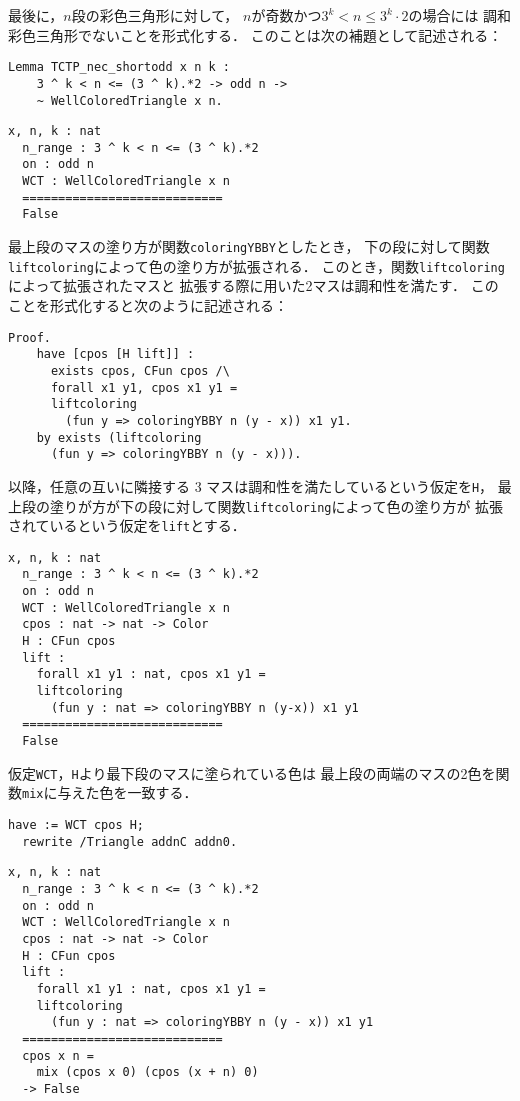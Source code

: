 最後に，$n$段の彩色三角形に対して，
$n$が奇数かつ$3^{k} < n \leq 3^{k} \cdot 2$の場合には
調和彩色三角形でないことを形式化する．
このことは次の補題として記述される：
\begin{lstlisting}[language=Coq]
  Lemma TCTP_nec_shortodd x n k :
    3 ^ k < n <= (3 ^ k).*2 -> odd n ->
    ~ WellColoredTriangle x n.
\end{lstlisting}
\begin{lstlisting}[language=Coq]
  x, n, k : nat
  n_range : 3 ^ k < n <= (3 ^ k).*2
  on : odd n
  WCT : WellColoredTriangle x n
  ============================
  False
\end{lstlisting}
最上段のマスの塗り方が関数{\tt{coloringYBBY}}としたとき，
下の段に対して関数{\tt{liftcoloring}}によって色の塗り方が拡張される．
このとき，関数{\tt{liftcoloring}}によって拡張されたマスと
拡張する際に用いた2マスは調和性を満たす．
このことを形式化すると次のように記述される：
\begin{lstlisting}[language=Coq]
  Proof.
    have [cpos [H lift]] :
      exists cpos, CFun cpos /\
      forall x1 y1, cpos x1 y1 =
      liftcoloring
        (fun y => coloringYBBY n (y - x)) x1 y1.
    by exists (liftcoloring
      (fun y => coloringYBBY n (y - x))).
\end{lstlisting}
以降，任意の互いに隣接する 3 マスは調和性を満たしているという仮定を{\tt{H}}，
最上段の塗りが方が下の段に対して関数{\tt{liftcoloring}}によって色の塗り方が
拡張されているという仮定を{\tt{lift}}とする．
\begin{lstlisting}[language=Coq]
  x, n, k : nat
  n_range : 3 ^ k < n <= (3 ^ k).*2
  on : odd n
  WCT : WellColoredTriangle x n
  cpos : nat -> nat -> Color
  H : CFun cpos
  lift :
    forall x1 y1 : nat, cpos x1 y1 =
    liftcoloring
      (fun y : nat => coloringYBBY n (y-x)) x1 y1
  ============================
  False
\end{lstlisting}
仮定{\tt{WCT}}，{\tt{H}}より最下段のマスに塗られている色は
最上段の両端のマスの2色を関数{\tt{mix}}に与えた色を一致する．
\begin{lstlisting}[language=Coq]
  have := WCT cpos H;
  rewrite /Triangle addnC addn0.
\end{lstlisting}
\begin{lstlisting}[language=Coq]
  x, n, k : nat
  n_range : 3 ^ k < n <= (3 ^ k).*2
  on : odd n
  WCT : WellColoredTriangle x n
  cpos : nat -> nat -> Color
  H : CFun cpos
  lift :
    forall x1 y1 : nat, cpos x1 y1 =
    liftcoloring
      (fun y : nat => coloringYBBY n (y - x)) x1 y1
  ============================
  cpos x n =
    mix (cpos x 0) (cpos (x + n) 0)
  -> False
\end{lstlisting}
